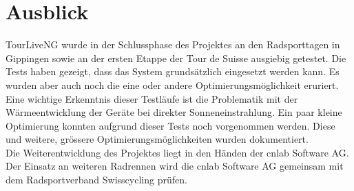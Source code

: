 \section*{Ausblick}
TourLiveNG wurde in der Schlussphase des Projektes an den Radsporttagen in Gippingen sowie an der ersten Etappe der Tour de Suisse ausgiebig getestet. Die Tests haben gezeigt, dass das System grundsätzlich eingesetzt werden kann. Es wurden aber auch noch die eine oder andere Optimierungsmöglichkeit eruriert. Eine wichtige Erkenntnis dieser Testläufe ist die Problematik mit der Wärmeentwicklung der Geräte bei direkter Sonneneinstrahlung. Ein paar kleine Optimierung konnten aufgrund dieser Tests noch vorgenommen werden. Diese und weitere, grössere Optimierungsmöglichkeiten wurden dokumentiert.
\\

Die Weiterentwicklung des Projektes liegt in den Händen der cnlab Software AG. Der Einsatz an weiteren Radrennen wird die cnlab Software AG gemeinsam mit dem Radsportverband Swisscycling prüfen.

